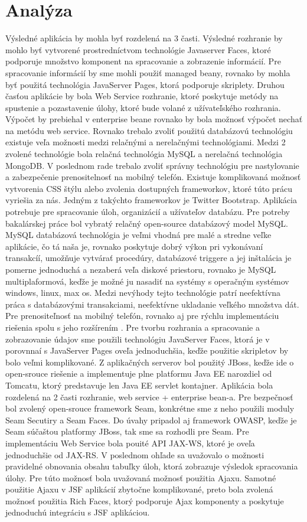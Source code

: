 \section{Analýza}
Výsledné aplikácia by mohla byť rozdelená na 3 časti. Výsledné rozhranie by mohlo byť vytvorené prostredníctvom technológie Javaserver Faces, ktoré podporuje množstvo komponent na spracovanie a zobrazenie informácií. Pre spracovanie informácií by sme mohli použiť managed beany, rovnako by mohla byť použitá technológia JavaServer Pages, ktorá podporuje skriplety. Druhou časťou aplikácie by bola Web Service rozhranie, ktoré poskytuje metódy na spustenie a pozastavenie úlohy, ktoré bude volané z užívateľského rozhrania. Výpočet by prebiehal v enterprise beane rovnako by bola možnosť výpočet nechať na metódu web service. Rovnako trebalo zvoliť použitú databázovú technológiu existuje veľa možnosti medzi relačnými a nerelačnými technológiami. Medzi 2 zvolené technológie bola relačná technológia MySQL a nerelačná technológia MongoDB. V poslednom rade trebalo zvoliť správny technológiu pre nastylovanie a zabezpečenie prenositelnosť na mobilný telefón. Existuje komplikovaná možnosť  vytvorenia CSS štýlu alebo zvolenia dostupných frameworkov, ktoré túto prácu vyriešia za nás. Jedným z takýchto frameworkov je Twitter Bootstrap. Aplikácia potrebuje pre spracovanie úloh, organizácií a užívateľov databázu. Pre potreby bakalárskej práce bol vybratý relačný open-source databázový model MySQL. MySQL databázová technológia je veľmi vhodná pre malé a stredne veľke aplikácie, čo tá naša je, rovnako poskytuje dobrý výkon pri vykonávaní transakcíí, umožňuje vytvárať procedúry, databázové triggere a jej inštalácia je pomerne jednoduchá a nezaberá veľa diskové priestoru, rovnako je MySQL multiplaformová, keďže je možné ju nasadiť na systémy s operačným systémov windows, linux, max os. Medzi nevýhody tejto technológie patrí neefektívna práca s databázovými transakciami, neefektívne ukladanie veľkého množstva dát. Pre prenositeľnosť na mobilný telefón, rovnako aj pre rýchlu implementáciu riešenia spolu s jeho rozšírením . Pre tvorbu rozhrania a spracovanie a zobrazovanie údajov sme použili technológiu JavaServer Faces, ktorá je v porovnnaí s JavaServer Pages oveľa jednoduchšia, keďže použitie skripletov by bolo veľmi komplikované. Z aplikačných serverov bol použitý JBoss, keďže ide o open-srouce riešenie a implementuje plne platformu Java EE narozdiel od Tomcatu, ktorý predstavuje len Java EE servlet kontajner. Aplikácia bola rozdelená na 2 časti rozhranie, web service + enterprise bean-a. Pre bezpečnosť bol zvolený open-srouce framework Seam, konkrétne sme z neho použili moduly Seam Secutiry a Seam Faces. Do úvahy pripadol aj framework OWASP, keďže je Seam súčaštou platformy JBoss, tak sme sa rozhodli pre Seam. Pre implementáciu Web Service bola pouité API JAX-WS, ktoré je oveľa jednoduchšie od JAX-RS. V poslednom ohľade sa uvažovalo o možnosti pravidelné obnovania obsahu tabuľky úloh, ktorá zobrazuje výsledok spracovania úlohy. Pre túto možnosť bola uvažovaná možnosť použitia Ajaxu. Samotné použitie Ajaxu v JSF aplikácií zbytočne komplikované, preto bola zvolená možnosť použitia Rich Faces, ktorý podporuje Ajax komponenty a poskytuje jednoduchú integráciu s JSF aplikáciou.




